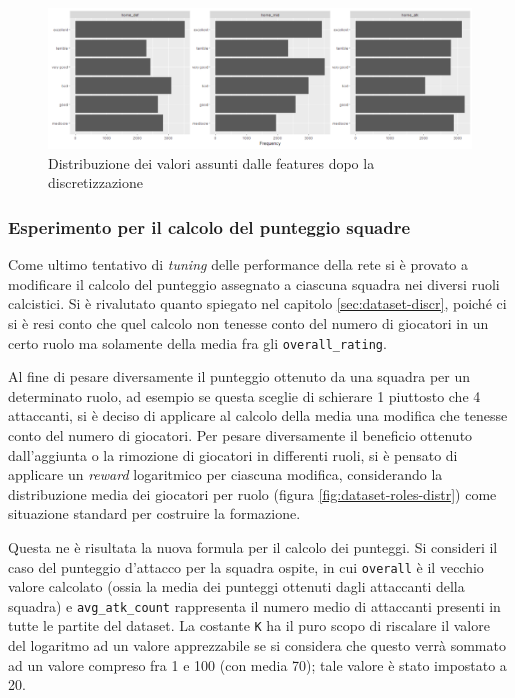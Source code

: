 \documentclass[hidelinks, 12pt]{article}
\begin{document}
\begin{figure}[H]
	\centering
	\includegraphics[scale=0.45]{images/06_04_discr_distr.png}
	\caption[Distribuzione dei valori assunti dalle features dopo la discretizzazione]{Distribuzione dei valori assunti dalle features dopo la discretizzazione}
	\label{fig:perf-discr-distr}
\end{figure}


\subsubsection{Esperimento per il calcolo del punteggio squadre}

Come ultimo tentativo di \textit{tuning} delle performance della rete si è provato a modificare il calcolo del punteggio assegnato a ciascuna squadra nei diversi ruoli calcistici. Si è rivalutato quanto spiegato nel capitolo \ref{sec:dataset-discr}, poiché ci si è resi conto che quel calcolo non tenesse conto del numero di giocatori in un certo ruolo ma solamente della media fra gli \texttt{overall\_rating}.

Al fine di pesare diversamente il punteggio ottenuto da una squadra per un determinato ruolo, ad esempio se questa sceglie di schierare 1 piuttosto che 4 attaccanti, si è deciso di applicare al calcolo della media una modifica che tenesse conto del numero di giocatori. Per pesare diversamente il beneficio ottenuto dall'aggiunta o la rimozione di giocatori in differenti ruoli, si è pensato di applicare un \textit{reward} logaritmico per ciascuna modifica, considerando la distribuzione media dei giocatori per ruolo (figura \ref{fig:dataset-roles-distr}) come situazione standard per costruire la formazione.

Questa ne è risultata la nuova formula per il calcolo dei punteggi. Si consideri il caso del punteggio d'attacco per la squadra ospite, in cui \texttt{overall} è il vecchio valore calcolato (ossia la media dei punteggi ottenuti dagli attaccanti della squadra) e \texttt{avg\_atk\_count} rappresenta il numero medio di attaccanti presenti in tutte le partite del dataset. La costante \texttt{K} ha il puro scopo di riscalare il valore del logaritmo ad un valore apprezzabile se si considera che questo verrà sommato ad un valore compreso fra 1 e 100 (con media 70); tale valore è stato impostato a 20.
\end{document}
